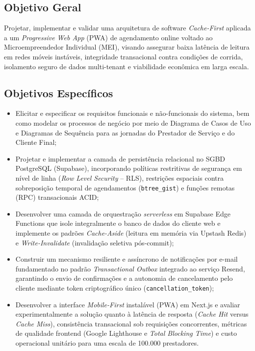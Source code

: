 \documentclass[12pt,a4paper]{article}
\begin{document}
\subsection{Objetivo Geral}
\label{subsec:objetivo_geral}

Projetar, implementar e validar uma arquitetura de software \textit{Cache-First} aplicada a um \textit{Progressive Web App} (PWA) de agendamento online voltado ao Microempreendedor Individual (MEI), visando assegurar baixa latência de leitura em redes móveis instáveis, integridade transacional contra condições de corrida, isolamento seguro de dados multi-tenant e viabilidade econômica em larga escala.

\subsection{Objetivos Específicos}
\label{subsec:objetivos_especificos}

\begin{itemize}
    \item Elicitar e especificar os requisitos funcionais e não-funcionais do sistema, bem como modelar os processos de negócio por meio de Diagrama de Casos de Uso e Diagramas de Sequência para as jornadas do Prestador de Serviço e do Cliente Final;
    \item Projetar e implementar a camada de persistência relacional no SGBD PostgreSQL (Supabase), incorporando políticas restritivas de segurança em nível de linha (\textit{Row Level Security} -- RLS), restrições espaciais contra sobreposição temporal de agendamentos (\texttt{btree\_gist}) e funções remotas (RPC) transacionais ACID;
    \item Desenvolver uma camada de orquestração \textit{serverless} em Supabase Edge Functions que isole integralmente o banco de dados do cliente web e implemente os padrões \textit{Cache-Aside} (leitura em memória via Upstash Redis) e \textit{Write-Invalidate} (invalidação seletiva pós-commit);
    \item Construir um mecanismo resiliente e assíncrono de notificações por e-mail fundamentado no padrão \textit{Transactional Outbox} integrado ao serviço Resend, garantindo o envio de confirmações e a autonomia de cancelamento pelo cliente mediante token criptográfico único (\texttt{cancellation\_token});
    \item Desenvolver a interface \textit{Mobile-First} instalável (PWA) em Next.js e avaliar experimentalmente a solução quanto à latência de resposta (\textit{Cache Hit} versus \textit{Cache Miss}), consistência transacional sob requisições concorrentes, métricas de qualidade frontend (Google Lighthouse e \textit{Total Blocking Time}) e custo operacional unitário para uma escala de 100.000 prestadores.
\end{itemize}
\end{document}
